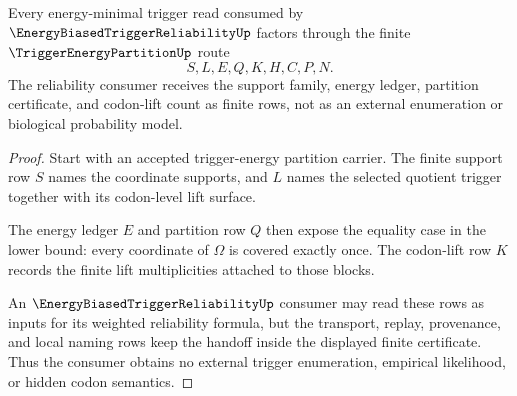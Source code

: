 \begin{theorem}
\label{thm:trigger-energy-partition-reliability-handoff}
Every energy-minimal trigger read consumed by $\EnergyBiasedTriggerReliabilityUp$ factors through the finite $\TriggerEnergyPartitionUp$ route
$$
S,L,E,Q,K,H,C,P,N .
$$
The reliability consumer receives the support family, energy ledger, partition certificate, and codon-lift count as finite rows, not as an external enumeration or biological probability model.
\end{theorem}
\begin{proof}
Start with an accepted trigger-energy partition carrier. The finite support row $S$ names the coordinate supports, and $L$ names the selected quotient trigger together with its codon-level lift surface.

The energy ledger $E$ and partition row $Q$ then expose the equality case in the lower bound: every coordinate of $\Omega$ is covered exactly once. The codon-lift row $K$ records the finite lift multiplicities attached to those blocks.

An $\EnergyBiasedTriggerReliabilityUp$ consumer may read these rows as inputs for its weighted reliability formula, but the transport, replay, provenance, and local naming rows keep the handoff inside the displayed finite certificate. Thus the consumer obtains no external trigger enumeration, empirical likelihood, or hidden codon semantics.
\end{proof}




